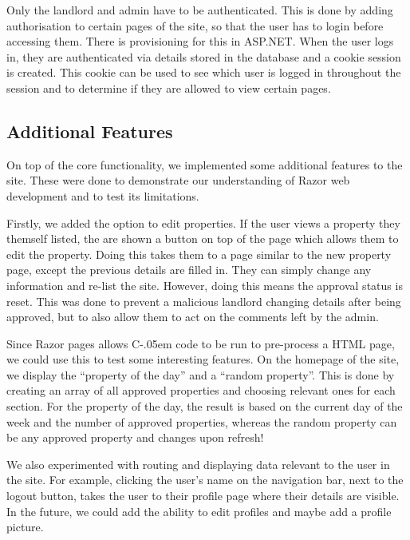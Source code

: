 \documentclass{article}
\newcommand{\Csharp}{%
  {\settoheight{\dimen0}{C}C\kern-.05em \resizebox{!}{\dimen0}{\raisebox{\depth}{\#}}}}
\begin{document}
        \par
            Only the landlord and admin have to be authenticated.
            This is done by adding authorisation to certain pages of the site, so that the user has to login before accessing them.
            There is provisioning for this in ASP.NET.
            When the user logs in, they are authenticated via details stored in the database and a cookie session is created.
            This cookie can be used to see which user is logged in throughout the session and to determine if they are allowed to view certain pages.

    \subsection{Additional Features}
        \par
            On top of the core functionality, we implemented some additional features to the site.
            These were done to demonstrate our understanding of Razor web development and to test its limitations.

        \par
            Firstly, we added the option to edit properties.
            If the user views a property they themself listed, the are shown a button on top of the page which allows them to edit the property.
            Doing this takes them to a page similar to the new property page, except the previous details are filled in.
            They can simply change any information and re-list the site.
            However, doing this means the approval status is reset.
            This was done to prevent a malicious landlord changing details after being approved, but to also allow them to act on the comments left by the admin.

        \par
            Since Razor pages allows \Csharp\space code to be run to pre-process a HTML page, we could use this to test some interesting features.
            On the homepage of the site, we display the “property of the day” and a “random property”.
            This is done by creating an array of all approved properties and choosing relevant ones for each section.
            For the property of the day, the result is based on the current day of the week and the number of approved properties, whereas the random property can be any approved property and changes upon refresh!

        \par
            We also experimented with routing and displaying data relevant to the user in the site.
            For example, clicking the user’s name on the navigation bar, next to the logout button, takes the user to their profile page where their details are visible.
            In the future, we could add the ability to edit profiles and maybe add a profile picture.
\end{document}
